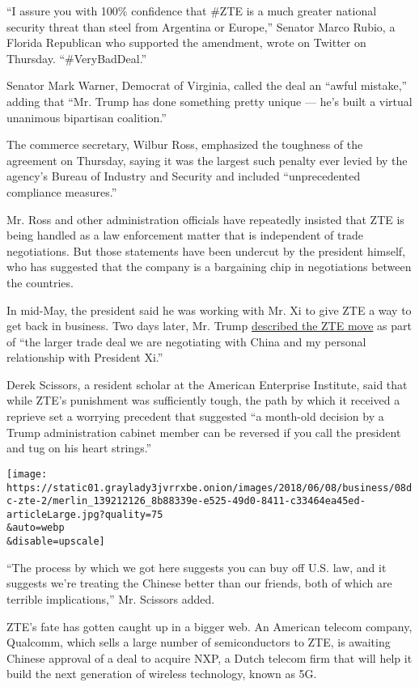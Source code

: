 ``I assure you with 100\% confidence that \#ZTE is a much greater
national security threat than steel from Argentina or Europe,'' Senator
Marco Rubio, a Florida Republican who supported the amendment, wrote on
Twitter on Thursday. ``\#VeryBadDeal.''

Senator Mark Warner, Democrat of Virginia, called the deal an ``awful
mistake,'' adding that ``Mr. Trump has done something pretty unique ---
he's built a virtual unanimous bipartisan coalition.''

The commerce secretary, Wilbur Ross, emphasized the toughness of the
agreement on Thursday, saying it was the largest such penalty ever
levied by the agency's Bureau of Industry and Security and included
``unprecedented compliance measures.''

Mr. Ross and other administration officials have repeatedly insisted
that ZTE is being handled as a law enforcement matter that is
independent of trade negotiations. But those statements have been
undercut by the president himself, who has suggested that the company is
a bargaining chip in negotiations between the countries.

In mid-May, the president said he was working with Mr. Xi to give ZTE a
way to get back in business. Two days later, Mr. Trump
\href{https://twitter.com/realDonaldTrump/status/996119678551552000}{described
the ZTE move} as part of ``the larger trade deal we are negotiating with
China and my personal relationship with President Xi.''

Derek Scissors, a resident scholar at the American Enterprise Institute,
said that while ZTE's punishment was sufficiently tough, the path by
which it received a reprieve set a worrying precedent that suggested ``a
month-old decision by a Trump administration cabinet member can be
reversed if you call the president and tug on his heart strings.''

\texttt{[image: https://static01.graylady3jvrrxbe.onion/images/2018/06/08/business/08dc-zte-2/merlin\_139212126\_8b88339e-e525-49d0-8411-c33464ea45ed-articleLarge.jpg?quality=75\\\&auto=webp\\\&disable=upscale]}

``The process by which we got here suggests you can buy off U.S. law,
and it suggests we're treating the Chinese better than our friends, both
of which are terrible implications,'' Mr. Scissors added.

ZTE's fate has gotten caught up in a bigger web. An American telecom
company, Qualcomm, which sells a large number of semiconductors to ZTE,
is awaiting Chinese approval of a deal to acquire NXP, a Dutch telecom
firm that will help it build the next generation of wireless technology,
known as 5G.

